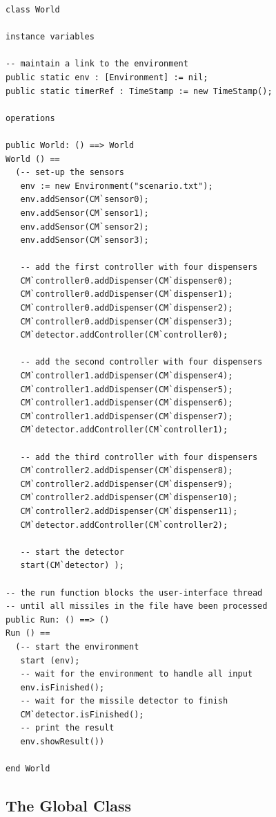 \documentclass{overturerepchap}
\begin{document}
\begin{lstlisting}
class World

instance variables

-- maintain a link to the environment
public static env : [Environment] := nil;
public static timerRef : TimeStamp := new TimeStamp();

operations

public World: () ==> World
World () ==
  (-- set-up the sensors
   env := new Environment("scenario.txt");
   env.addSensor(CM`sensor0);
   env.addSensor(CM`sensor1);
   env.addSensor(CM`sensor2);
   env.addSensor(CM`sensor3);

   -- add the first controller with four dispensers
   CM`controller0.addDispenser(CM`dispenser0);
   CM`controller0.addDispenser(CM`dispenser1);
   CM`controller0.addDispenser(CM`dispenser2);
   CM`controller0.addDispenser(CM`dispenser3);
   CM`detector.addController(CM`controller0);

   -- add the second controller with four dispensers
   CM`controller1.addDispenser(CM`dispenser4);
   CM`controller1.addDispenser(CM`dispenser5);
   CM`controller1.addDispenser(CM`dispenser6);
   CM`controller1.addDispenser(CM`dispenser7);
   CM`detector.addController(CM`controller1);
 
   -- add the third controller with four dispensers
   CM`controller2.addDispenser(CM`dispenser8);
   CM`controller2.addDispenser(CM`dispenser9);
   CM`controller2.addDispenser(CM`dispenser10);
   CM`controller2.addDispenser(CM`dispenser11);
   CM`detector.addController(CM`controller2);
      
   -- start the detector
   start(CM`detector) );

-- the run function blocks the user-interface thread
-- until all missiles in the file have been processed
public Run: () ==> ()
Run () == 
  (-- start the environment
   start (env);
   -- wait for the environment to handle all input
   env.isFinished();
   -- wait for the missile detector to finish
   CM`detector.isFinished();
   -- print the result
   env.showResult())

end World
\end{lstlisting}

\subsection{The Global Class}
\end{document}
